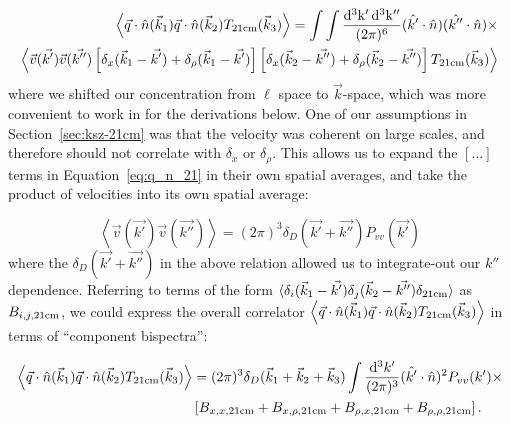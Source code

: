 \begin{equation}
\begin{split}
\left\langle \vec{q} \cdot \hat{n}(\vec{k}_1) \vec{q} \cdot \hat{n} (\vec{k}_2) T_{\rm 21cm}(\vec{k}_3) \right\rangle =
\int \int \frac{ {\rm d^3k' \, d^3k''} }{(2\pi)^6} (\hat{k'}\cdot\hat{n}) (\hat{k''}\cdot\hat{n}) \times \\
\left\langle 
\vec{v}(\vec{k'})\vec{v}(\vec{k''}) 
\left[ \delta_x(\vec{k}_1 - \vec{k'}) + \delta_{\rho}(\vec{k}_1 - \vec{k'})\right]
\left[ \delta_x(\vec{k}_2 - \vec{k''}) + \delta_{\rho}(\vec{k}_2 - \vec{k''})\right] 
T_{\rm 21cm}(\vec{k}_3)
\right\rangle
\end{split}
\label{eq:q_n_21}
\end{equation}
where we shifted our concentration from $\ell$ space to $\vec{k}$-space, which was more convenient to work in for the derivations below.
One of our assumptions in Section~\ref{sec:ksz-21cm} was that the velocity was coherent on large scales, and therefore should not correlate with $\delta_{x}$ or $\delta_{\rho}$. This allows us to expand the $[...]$ terms in Equation~\ref{eq:q_n_21} in their own spatial averages, and take the product of velocities into its own spatial average:

\begin{equation}
\left\langle \vec{v}(\vec{k'})\vec{v}(\vec{k''}) \right\rangle = (2\pi)^3 \delta_D(\vec{k'} + \vec{k''})P_{vv}(\vec{k'})
\label{eq:Pvv}
\end{equation}
where the $\delta_D(\vec{k'} + \vec{k''})$ in the above relation allowed us to integrate-out our $k''$ dependence. Referring to terms of the form $\langle \delta_i(\vec{k}_1 - \vec{k'}) \delta_j(\vec{k}_2 - \vec{k''}) \delta_{\rm 21cm}\rangle$ as $B_{i,j,{\rm 21cm}}$, we could express the overall correlator $\left\langle \vec{q} \cdot \hat{n}(\vec{k}_1) \vec{q} \cdot \hat{n} (\vec{k}_2) T_{\rm 21cm}(\vec{k}_3) \right\rangle$ in terms of ``component bispectra'':

\begin{equation}
\begin{split}
\left\langle \vec{q} \cdot \hat{n}(\vec{k}_1) \vec{q} \cdot \hat{n} (\vec{k}_2) T_{\rm 21cm}(\vec{k}_3) \right\rangle &= 
(2\pi)^3 \delta_D(\vec{k}_1 + \vec{k}_2 + \vec{k}_3) \int \frac{{\rm d^3}k'}{(2\pi)^3} (\hat{k'}\cdot\hat{n})^2 P_{vv}(k') \times \\
& 
\left[ B_{x,x,\rm 21cm} + B_{x,\rho,\rm 21cm} + B_{\rho,x,\rm 21cm} +B_{\rho,\rho,\rm 21cm} \right].
\end{split}
\end{equation}

